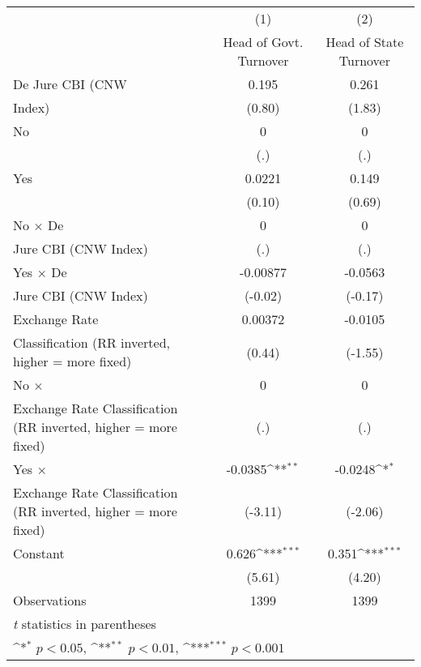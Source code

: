 {
\def\sym#1{\ifmmode^{#1}\else\(^{#1}\)\fi}
\begin{tabular}{l*{2}{c}}
\toprule
                &\multicolumn{1}{c}{(1)}&\multicolumn{1}{c}{(2)}\\
                &\multicolumn{1}{c}{Head of Govt. Turnover}&\multicolumn{1}{c}{Head of State Turnover}\\
\midrule
De Jure CBI (CNW&    0.195         &    0.261         \\
Index)          &   (0.80)         &   (1.83)         \\
\addlinespace
No              &        0         &        0         \\
                &      (.)         &      (.)         \\
\addlinespace
Yes             &   0.0221         &    0.149         \\
                &   (0.10)         &   (0.69)         \\
\addlinespace
No $\times$ De  &        0         &        0         \\
Jure CBI (CNW Index)&      (.)         &      (.)         \\
\addlinespace
Yes $\times$ De & -0.00877         &  -0.0563         \\
Jure CBI (CNW Index)&  (-0.02)         &  (-0.17)         \\
\addlinespace
Exchange Rate   &  0.00372         &  -0.0105         \\
Classification (RR inverted, higher = more fixed)&   (0.44)         &  (-1.55)         \\
\addlinespace
No $\times$     &        0         &        0         \\
Exchange Rate Classification (RR inverted, higher = more fixed)&      (.)         &      (.)         \\
\addlinespace
Yes $\times$    &  -0.0385\sym{**} &  -0.0248\sym{*}  \\
Exchange Rate Classification (RR inverted, higher = more fixed)&  (-3.11)         &  (-2.06)         \\
\addlinespace
Constant        &    0.626\sym{***}&    0.351\sym{***}\\
                &   (5.61)         &   (4.20)         \\
\midrule
Observations    &     1399         &     1399         \\
\bottomrule
\multicolumn{3}{l}{\footnotesize \textit{t} statistics in parentheses}\\
\multicolumn{3}{l}{\footnotesize \sym{*} \(p<0.05\), \sym{**} \(p<0.01\), \sym{***} \(p<0.001\)}\\
\end{tabular}
}
